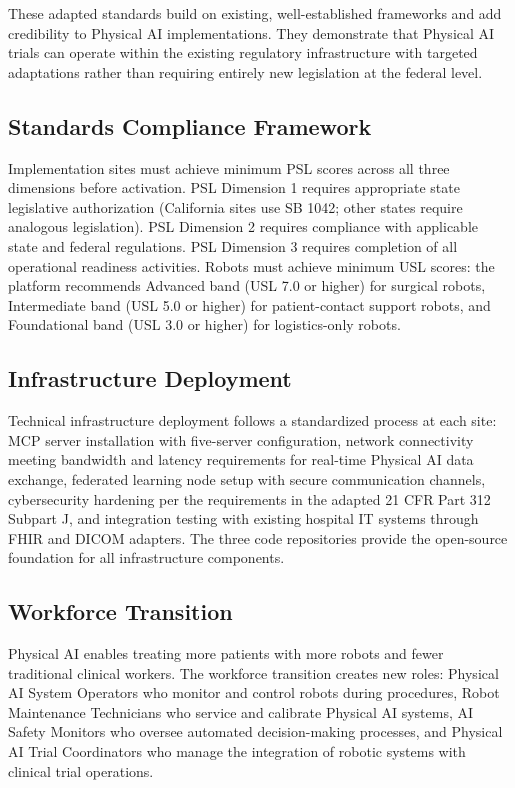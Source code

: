 These adapted standards build on existing, well-established frameworks and add
credibility to Physical AI implementations. They demonstrate that Physical AI
trials can operate within the existing regulatory infrastructure with targeted
adaptations rather than requiring entirely new legislation at the federal level.

\subsection{Standards Compliance Framework}
\label{subsec:impl-standards}

Implementation sites must achieve minimum PSL scores across all three
dimensions before activation. PSL Dimension 1 requires appropriate state
legislative authorization (California sites use SB 1042; other states require
analogous legislation). PSL Dimension 2 requires compliance with applicable
state and federal regulations. PSL Dimension 3 requires completion of all
operational readiness activities. Robots must achieve minimum USL scores: the
platform recommends Advanced band (USL 7.0 or higher) for surgical robots,
Intermediate band (USL 5.0 or higher) for patient-contact support robots, and
Foundational band (USL 3.0 or higher) for logistics-only robots.

\subsection{Infrastructure Deployment}
\label{subsec:impl-infrastructure}

Technical infrastructure deployment follows a standardized process at each
site: MCP server installation with five-server configuration, network
connectivity meeting bandwidth and latency requirements for real-time Physical
AI data exchange, federated learning node setup with secure communication
channels, cybersecurity hardening per the requirements in the adapted 21 CFR
Part 312 \cite{cfr312-adapt} Subpart J, and integration testing with existing
hospital IT systems through FHIR \cite{hl7-fhir} and DICOM \cite{dicom}
adapters. The three code repositories \cite{main-repo, mcp-repo, fl-repo}
provide the open-source foundation for all infrastructure components.

\subsection{Workforce Transition}
\label{subsec:impl-workforce}

Physical AI enables treating more patients with more robots and fewer
traditional clinical workers. The workforce transition creates new roles:
Physical AI System Operators who monitor and control robots during procedures,
Robot Maintenance Technicians who service and calibrate Physical AI systems,
AI Safety Monitors who oversee automated decision-making processes, and
Physical AI Trial Coordinators who manage the integration of robotic systems
with clinical trial operations.

